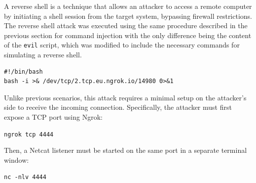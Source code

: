 A reverse shell is a technique that allows an attacker to access a remote computer by initiating a shell session from the target system, bypassing firewall restrictions.
The reverse shell attack was executed using the same procedure described in the previous section for command injection with the only difference being the content of the \texttt{evil} script, which was modified to include the necessary commands for simulating a reverse shell.
\begin{verbatim}
#!/bin/bash
bash -i >& /dev/tcp/2.tcp.eu.ngrok.io/14980 0>&1
\end{verbatim}
Unlike previous scenarios, this attack requires a minimal setup on the attacker's side to receive the incoming connection. Specifically, the attacker must first expose a TCP port using Ngrok:

\texttt{ngrok tcp 4444}

\noindent Then, a Netcat listener must be started on the same port in a separate terminal window:

\texttt{nc -nlv 4444}


